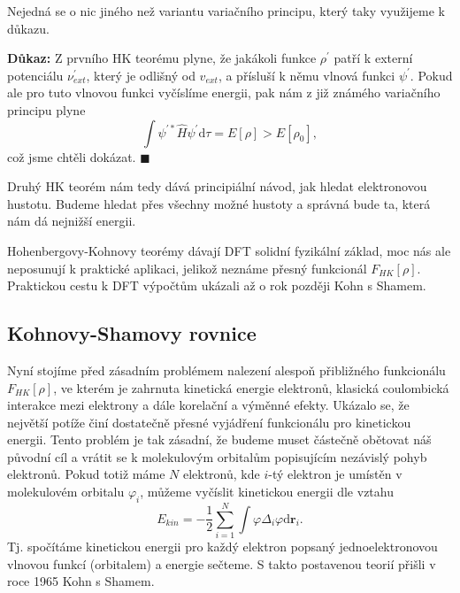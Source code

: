 Nejedná se o nic jiného než variantu variačního principu, který taky využijeme k důkazu.

\bigskip
\textbf{Důkaz:} Z prvního HK teorému plyne, že jakákoli funkce $\rho^{\prime}$ patří k externí potenciálu $\nu_{ext}^{\prime}$, který je odlišný od $v_{ext}$, a přísluší k němu vlnová funkci $\psi^{\prime}$. Pokud ale pro tuto vlnovou funkci vyčíslíme energii, pak nám z již známého variačního principu plyne
\begin{equation}
\int \psi^{\prime *} \hat{H} \psi^{\prime} \mathrm{d}\tau = E[\rho] > E [\rho_0],
\end{equation}
což jsme chtěli dokázat. \hfill {\footnotesize $\blacksquare$}

Druhý HK teorém nám tedy dává principiální návod, jak hledat elektronovou hustotu. Budeme hledat přes všechny možné hustoty a správná bude ta, která nám dá nejnižší energii.

Hohenbergovy-Kohnovy teorémy dávají DFT solidní fyzikální základ, moc nás ale neposunují k praktické aplikaci, jelikož neznáme přesný funkcionál $F_{HK}[\rho]$.
Praktickou cestu k DFT výpočtům ukázali až o rok později Kohn s Shamem.

\subsection{Kohnovy-Shamovy rovnice}

Nyní stojíme před zásadním problémem nalezení alespoň přibližného funkcionálu $F_{HK}[\rho]$, ve kterém je zahrnuta kinetická energie elektronů, klasická coulombická interakce mezi elektrony a dále korelační a výměnné efekty. 
Ukázalo se, že největší potíže činí dostatečně přesné vyjádření funkcionálu pro kinetickou energii.
Tento problém je tak zásadní, že budeme muset částečně obětovat náš původní cíl a vrátit se k molekulovým orbitalům popisujícím nezávislý pohyb elektronů.
Pokud totiž máme $N$ elektronů, kde $i$-tý elektron je umístěn v molekulovém orbitalu $\varphi_i$, můžeme vyčíslit kinetickou energii dle vztahu
\begin{equation}
E_{kin}=-\frac{1}{2}\sum_{i=1}^N \int \varphi \Delta_i \varphi \mathrm{d}\textbf{r}_i .
\end{equation}
Tj. spočítáme kinetickou energii pro každý elektron popsaný jednoelektronovou vlnovou funkcí (orbitalem) a energie sečteme. S takto postavenou teorií přišli v roce 1965 Kohn s Shamem.

